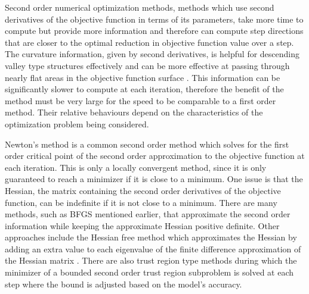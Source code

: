 \documentclass[letterpaper,12pt,titlepage,oneside,final]{book}
\begin{document}
	Second order numerical optimization methods, methods which use second derivatives of the objective function in terms of its parameters, take more time to compute but provide more information and therefore can compute step directions that are closer to the optimal reduction in objective function value over a step. The curvature information, given by second derivatives, is helpful for descending valley type structures effectively and can be more effective at passing through nearly flat areas in the objective function surface \cite{Shepherd.1997}. This information can be significantly slower to compute at each iteration, therefore the benefit of the method must be very large for the speed to be comparable to a first order method. Their relative behaviours depend on the characteristics of the optimization problem being considered. 
	
	Newton's method is a common second order method which solves for the first order critical point of the second order approximation to the objective function at each iteration. This is only a locally convergent method, since it is only guaranteed to reach a minimizer if it is close to a minimum. One issue is that the Hessian, the matrix containing the second order derivatives of the objective function, can be indefinite if it is not close to a minimum. There are many methods, such as BFGS mentioned earlier, that approximate the second order information while keeping the approximate Hessian positive definite. Other approaches include the Hessian free method which approximates the Hessian by adding an extra value to each eigenvalue of the finite difference approximation of the Hessian matrix \cite{martens2010deep}. There are also trust region type methods during which the minimizer of a bounded second order trust region subproblem is solved at each step where the bound is adjusted based on the model's accuracy. 
	
\end{document}
